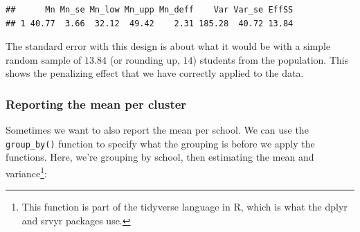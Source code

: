 \documentclass[
]{article}
\newenvironment{Shaded}{\begin{snugshade}}{\end{snugshade}}
\newcommand{\DataTypeTok}[1]{\textcolor[rgb]{0.13,0.29,0.53}{#1}}
\newcommand{\DecValTok}[1]{\textcolor[rgb]{0.00,0.00,0.81}{#1}}
\newcommand{\KeywordTok}[1]{\textcolor[rgb]{0.13,0.29,0.53}{\textbf{#1}}}
\newcommand{\NormalTok}[1]{#1}
\newcommand{\OperatorTok}[1]{\textcolor[rgb]{0.81,0.36,0.00}{\textbf{#1}}}
\newcommand{\StringTok}[1]{\textcolor[rgb]{0.31,0.60,0.02}{#1}}
\begin{document}
\begin{Shaded}
\end{Shaded}

\begin{verbatim}
##      Mn Mn_se Mn_low Mn_upp Mn_deff    Var Var_se EffSS
## 1 40.77  3.66  32.12  49.42    2.31 185.28  40.72 13.84
\end{verbatim}

The standard error with this design is about what it would be with a simple random sample of \(13.84\) (or rounding up, \(14\)) students from the population. This shows the penalizing effect that we have correctly applied to the data.

\hypertarget{reporting-the-mean-per-cluster}{%
\subsubsection{Reporting the mean per cluster}\label{reporting-the-mean-per-cluster}}

Sometimes we want to also report the mean per school. We can use the \texttt{group\_by()} function to specify what the grouping is before we apply the functions. Here, we're grouping by school, then estimating the mean and variance\footnote{This function is part of the tidyverse language in R, which is what the dplyr and srvyr packages use.}:

\begin{Shaded}
\end{Shaded}
\end{document}
